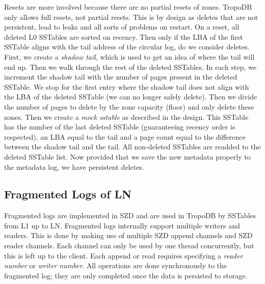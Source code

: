 Resets are more involved because there are no partial resets of zones. TropoDB only allows full resets, not partial resets. This is by design as deletes that are not persistent, lead to leaks and all sorts of problems on restart. On a reset, all deleted L0 SSTables are sorted on recency. Then only if the LBA of the first SSTable aligns with the tail address of the circular log, do we consider deletes. First, we create a \textit{shadow tail}, which is used to get an idea of where the tail will end up. Then we walk through the rest of the deleted SSTables. In each step, we increment the shadow tail with the number of pages present in the deleted SSTable. We stop for the first entry where the shadow tail does not align with the LBA of the deleted SSTable (we can no longer safely delete). Then we divide the number of pages to delete by the zone capacity (floor) and only delete these zones. Then we create a \textit{mock sstable} as described in the design. This SSTable has the number of the last deleted SSTable (guaranteeing recency order is respected), an LBA equal to the tail and a page count equal to the difference between the shadow tail and the tail. All non-deleted SSTables are readded to the deleted SSTable list. Now provided that we save the new metadata properly to the metadata log, we have persistent deletes.

\subsection{Fragmented Logs of LN}
Fragmented logs are implemented in SZD and are used in TropoDB by SSTables from L1 up to LN. Fragmented logs internally support multiple writers and readers. This is done by making use of multiple SZD append channels and SZD reader channels. Each channel can only be used by one thread concurrently, but this is left up to the client. Each append or read requires specifying a \textit{reader number} or \textit{writer number}. All operations are done synchronously to the fragmented log; they are only completed once the data is persisted to storage. 

